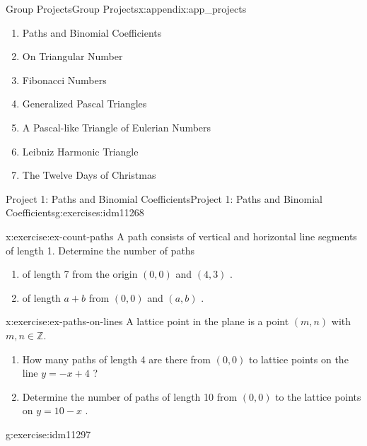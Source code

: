 \documentclass[oneside,10pt,]{book}
\numberwithin{equation}{chapter}
\def\Z{\mathbb Z}
\begin{document}
\begin{appendixptx}{Group Projects}{}{Group Projects}{}{}{x:appendix:app_projects}
\begin{introduction}{}%
%
\begin{enumerate}
\item{}Paths and Binomial Coefficients%
\item{}On Triangular Number%
\item{}Fibonacci Numbers%
\item{}Generalized Pascal Triangles%
\item{}A Pascal-like Triangle of Eulerian Numbers%
\item{}Leibniz Harmonic Triangle%
\item{}The Twelve Days of Christmas%
\end{enumerate}
%
\end{introduction}%
%
%
\typeout{************************************************}
\typeout{************************************************}
%
\begin{exercises-section-numberless}{Project 1: Paths and Binomial Coefficients}{}{Project 1: Paths and Binomial Coefficients}{}{}{g:exercises:idm11268}
\begin{divisionexercise}{1}{}{}{x:exercise:ex-count-paths}%
A path consists of vertical and horizontal line segments of length 1. Determine the number of paths%
\begin{enumerate}[label=(\alph*)]
\item{}of length 7 from the origin \(\left( 0,0 \right)\) and \((4,3)\) .%
\item{}of length \(a + b\) from \(\left( 0,0 \right)\) and \((a,b)\) .%
\end{enumerate}
%
\end{divisionexercise}%
\begin{divisionexercise}{2}{}{}{x:exercise:ex-paths-on-lines}%
A lattice point in the plane is a point \((m,n)\) with \(m,n \in \Z\).%
\begin{enumerate}[label=(\alph*)]
\item{}How many paths of length 4 are there from \((0,0)\) to lattice points on the line \(y = - x + 4\) ?%
\item{}Determine the number of paths of length 10 from \((0,0)\) to the lattice points on \(y = 10 - x\) .%
\end{enumerate}
%
\end{divisionexercise}%
\begin{divisionexercise}{3}{}{}{g:exercise:idm11297}%

\end{divisionexercise}
\end{exercises-section-numberless}
\end{appendixptx}
\end{document}
